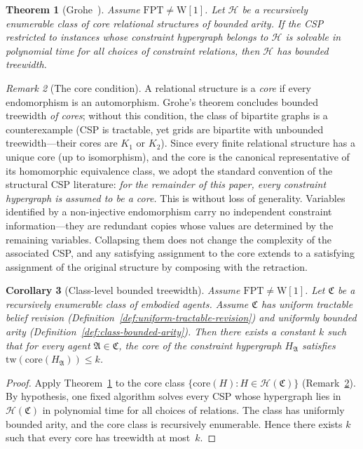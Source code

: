 \documentclass[11pt,a4paper]{article}
\theoremstyle{plain}
\newtheorem{theorem}{Theorem}[section]
\newtheorem{corollary}[theorem]{Corollary}
\theoremstyle{definition}
\theoremstyle{remark}
\newtheorem{remark}[theorem]{Remark}
\begin{document}
\begin{theorem}[Grohe~\cite{Grohe07}]\label{thm:grohe}
Assume $\mathrm{FPT} \neq \mathrm{W}[1]$.
Let $\mathcal{H}$ be a recursively enumerable class of core relational structures of bounded arity.
If the CSP restricted to instances whose constraint hypergraph belongs to $\mathcal{H}$ is solvable in polynomial time for all choices of constraint relations, then $\mathcal{H}$ has bounded treewidth.
\end{theorem}

\begin{remark}[The core condition]\label{rem:core}
A relational structure is a \emph{core} if every endomorphism is an automorphism.
Grohe's theorem concludes bounded treewidth \emph{of cores}; without this condition, the class of bipartite graphs is a counterexample (CSP is tractable, yet grids are bipartite with unbounded treewidth---their cores are $K_1$ or $K_2$).
Since every finite relational structure has a unique core (up to isomorphism), and the core is the canonical representative of its homomorphic equivalence class, we adopt the standard convention of the structural CSP literature: \emph{for the remainder of this paper, every constraint hypergraph is assumed to be a core.}
This is without loss of generality.
Variables identified by a non-injective endomorphism carry no independent constraint information---they are redundant copies whose values are determined by the remaining variables.
Collapsing them does not change the complexity of the associated CSP, and any satisfying assignment to the core extends to a satisfying assignment of the original structure by composing with the retraction.
\end{remark}

\begin{corollary}[Class-level bounded treewidth]\label{cor:tractable-tw}
Assume $\mathrm{FPT} \neq \mathrm{W}[1]$.
Let $\mathfrak{C}$ be a recursively enumerable class of embodied agents.
Assume $\mathfrak{C}$ has uniform tractable belief revision (Definition~\ref{def:uniform-tractable-revision}) and uniformly bounded arity (Definition~\ref{def:class-bounded-arity}).
Then there exists a constant $k$ such that for every agent $\mathfrak{A} \in \mathfrak{C}$, the core of the constraint hypergraph $H_{\mathfrak{A}}$ satisfies $\mathrm{tw}(\mathrm{core}(H_{\mathfrak{A}})) \leq k$.
\end{corollary}

\begin{proof}
Apply Theorem~\ref{thm:grohe} to the core class $\{\mathrm{core}(H) : H \in \mathcal{H}(\mathfrak{C})\}$ (Remark~\ref{rem:core}).
By hypothesis, one fixed algorithm solves every CSP whose hypergraph lies in $\mathcal{H}(\mathfrak{C})$ in polynomial time for all choices of relations.
The class has uniformly bounded arity, and the core class is recursively enumerable.
Hence there exists $k$ such that every core has treewidth at most~$k$.
\end{proof}
\end{document}

